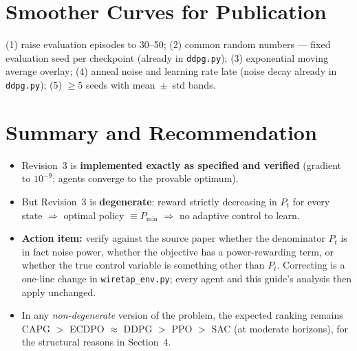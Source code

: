 \documentclass[11pt]{article}
\begin{document}
\section{Smoother Curves for Publication}
(1) raise evaluation episodes to 30--50; (2) common random numbers --- fixed evaluation seed per
checkpoint (already in \texttt{ddpg.py}); (3) exponential moving average overlay; (4) anneal
noise and learning rate late (noise decay already in \texttt{ddpg.py}); (5) $\ge 5$ seeds with
mean~$\pm$~std bands.

\section{Summary and Recommendation}
\begin{itemize}[nosep]
\item Revision~3 is \textbf{implemented exactly as specified and verified} (gradient to
$10^{-9}$; agents converge to the provable optimum).
\item But Revision~3 is \textbf{degenerate}: reward strictly decreasing in $P_t$ for every state
$\Rightarrow$ optimal policy $\equiv P_{\min}$ $\Rightarrow$ no adaptive control to learn.
\item \textbf{Action item:} verify against the source paper whether the denominator $P_t$ is in
fact noise power, whether the objective has a power-rewarding term, or whether the true control
variable is something other than $P_t$. Correcting is a one-line change in
\texttt{wiretap\_env.py}; every agent and this guide's analysis then apply unchanged.
\item In any \emph{non-degenerate} version of the problem, the expected ranking remains
CAPG $>$ ECDPO $\approx$ DDPG $>$ PPO $>$ SAC (at moderate horizons), for the structural reasons
in Section~4.
\end{itemize}
\end{document}
